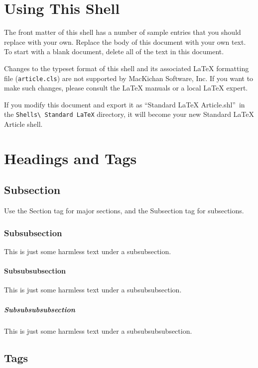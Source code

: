 \documentclass{article}
\begin{document}
\section{Using This Shell}

The front matter of this shell has a number of sample entries that you
should replace with your own. Replace the body of this document with your
own text. To start with a blank document, delete all of the text in this
document.

Changes to the typeset format of this shell and its associated \LaTeX{}
formatting file (\texttt{article.cls}) are not supported by MacKichan
Software, Inc. If you want to make such changes, please consult the \LaTeX{}
manuals or a local \LaTeX{} expert.

If you modify this document and export it as \textquotedblleft Standard
LaTeX Article.shl\textquotedblright\ in the \texttt{Shells\textbackslash
Standard LaTeX} directory, it will become your new Standard LaTeX Article
shell.

\section{Headings and Tags}

\subsection{Subsection}

Use the Section tag for major sections, and the Subsection tag for
subsections.

\subsubsection{Subsubsection}

This is just some harmless text under a subsubsection.

\paragraph{Subsubsubsection}

This is just some harmless text under a subsubsubsection.

\subparagraph{Subsubsubsubsection}

This is just some harmless text under a subsubsubsubsection.

\subsection{Tags}
\end{document}
